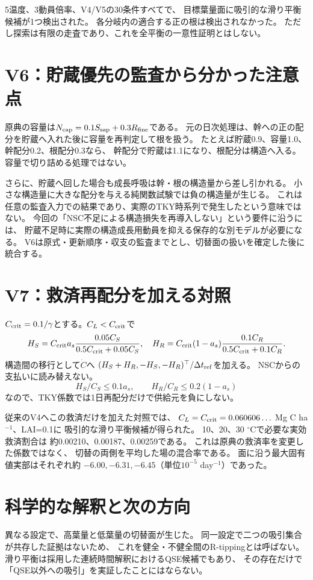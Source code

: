 \documentclass[a4paper,11pt]{ltjsarticle}
\begin{document}
5温度、3動員倍率、V4/V5の30条件すべてで、
目標葉量面に吸引的な滑り平衡候補が1つ検出された。
各分岐内の適合する正の根は検出されなかった。
ただし探索は有限の走査であり、これを全平衡の一意性証明とはしない。

\section{V6：貯蔵優先の監査から分かった注意点}
原典の容量は$N_{\rm cap}=0.1S_{\rm sap}+0.3R_{\rm fine}$である。
元の日次処理は、幹への正の配分を貯蔵へ入れた後に容量を再判定して根を扱う。
たとえば貯蔵0.9、容量1.0、幹配分0.2、根配分0.3なら、
幹配分で貯蔵は1.1になり、根配分は構造へ入る。
容量で切り詰める処理ではない。

さらに、貯蔵へ回した場合も成長呼吸は幹・根の構造量から差し引かれる。
小さな構造量に大きな配分を与える純関数試験では負の構造量が生じる。
これは任意の監査入力での結果であり、実際のTKY時系列で発生したという意味ではない。
今回の「NSC不足による構造損失を再導入しない」という要件に沿うには、
貯蔵不足時に実際の構造成長用動員を抑える保存的な別モデルが必要になる。
V6は原式・更新順序・収支の監査までとし、切替面の扱いを確定した後に統合する。

\section{V7：救済再配分を加える対照}
$C_{\rm crit}=0.1/\gamma$とする。$C_L<C_{\rm crit}$で
\[
H_S=C_{\rm crit}a_s\frac{0.05C_S}{0.5C_{\rm crit}+0.05C_S},\quad
H_R=C_{\rm crit}(1-a_s)\frac{0.1C_R}{0.5C_{\rm crit}+0.1C_R}.
\]
構造間の移行として$\dot C$へ
$(H_S+H_R,-H_S,-H_R)^\top/\Delta t_{\rm ref}$を加える。
NSCからの支払いに読み替えない。
\[
H_S/C_S\le0.1a_s,\qquad H_R/C_R\le0.2(1-a_s)
\]
なので、TKY係数では1日再配分だけで供給元を負にしない。

従来のV4へこの救済だけを加えた対照では、
$C_L=C_{\rm crit}=0.060606\ldots$ Mg C ha$^{-1}$、LAI=0.1に
吸引的な滑り平衡候補が得られた。
10、20、30 $^\circ$Cで必要な実効救済割合は
約0.00210、0.00187、0.00259である。
これは原典の救済率を変更した係数ではなく、
切替の両側を平均した場の混合率である。
面に沿う最大固有値実部はそれぞれ約
$-6.00,-6.31,-6.45$（単位$10^{-5}$ day$^{-1}$）であった。

\section{科学的な解釈と次の方向}
異なる設定で、高葉量と低葉量の切替面が生じた。
同一設定で二つの吸引集合が共存した証拠はないため、
これを健全・不健全間のR-tippingとは呼ばない。
滑り平衡は採用した連続時間解釈におけるQSE候補でもあり、
その存在だけで「QSE以外への吸引」を実証したことにはならない。
\end{document}
